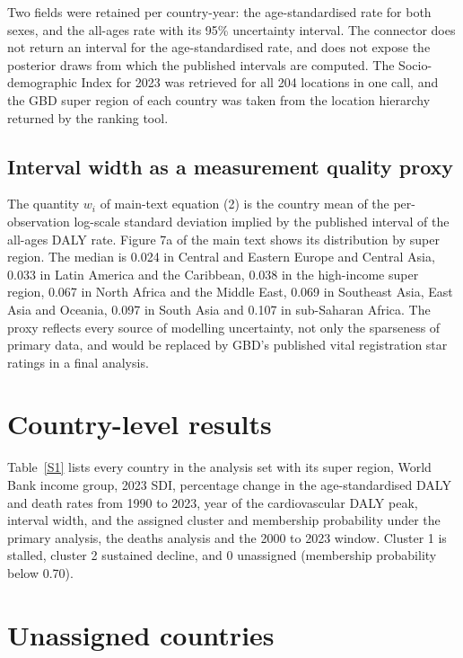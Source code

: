 \documentclass[11pt,a4paper]{article}
\begin{document}
Two fields were retained per country-year: the age-standardised rate for both sexes, and the all-ages rate with its 95\% uncertainty interval. The connector does not return an interval for the age-standardised rate, and does not expose the posterior draws from which the published intervals are computed. The Socio-demographic Index for 2023 was retrieved for all 204 locations in one call, and the GBD super region of each country was taken from the location hierarchy returned by the ranking tool.

\subsection{Interval width as a measurement quality proxy}

The quantity $w_i$ of main-text equation (2) is the country mean of the per-observation log-scale standard deviation implied by the published interval of the all-ages DALY rate. Figure 7a of the main text shows its distribution by super region. The median is 0.024 in Central and Eastern Europe and Central Asia, 0.033 in Latin America and the Caribbean, 0.038 in the high-income super region, 0.067 in North Africa and the Middle East, 0.069 in Southeast Asia, East Asia and Oceania, 0.097 in South Asia and 0.107 in sub-Saharan Africa. The proxy reflects every source of modelling uncertainty, not only the sparseness of primary data, and would be replaced by GBD's published vital registration star ratings in a final analysis.


\section{Country-level results}

Table~\ref{S1} lists every country in the analysis set with its super region, World Bank income group, 2023 SDI, percentage change in the age-standardised DALY and death rates from 1990 to 2023, year of the cardiovascular DALY peak, interval width, and the assigned cluster and membership probability under the primary analysis, the deaths analysis and the 2000 to 2023 window. Cluster 1 is stalled, cluster 2 sustained decline, and 0 unassigned (membership probability below 0.70).

\begingroup\scriptsize\setlength{\tabcolsep}{3.2pt}

\endgroup

\section{Unassigned countries}
\end{document}
